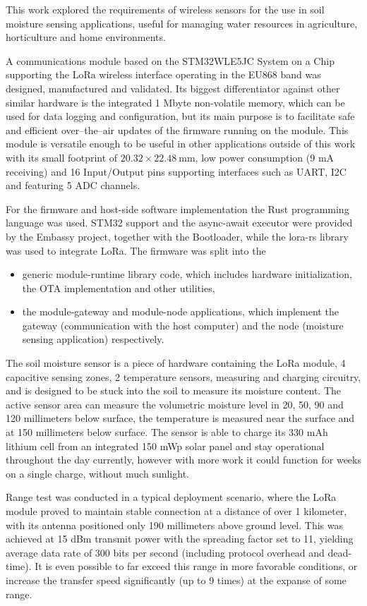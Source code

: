 
This work explored the requirements of wireless sensors for the use in soil moisture sensing applications, useful for managing water resources in agriculture, horticulture and home environments.

A communications module based on the STM32WLE5JC System on a Chip supporting the LoRa wireless interface operating in the EU868 band was designed, manufactured and validated. Its biggest differentiator against other similar hardware is the integrated 1 Mbyte non-volatile memory, which can be used for data logging and configuration, but its main purpose is to facilitate safe and efficient over--the--air updates of the firmware running on the module. This module is versatile enough to be useful in other applications outside of this work with its small footprint of $20.32 \times 22.48~\mathrm{mm}$, low power consumption (9 mA receiving) and 16 Input/Output pins supporting interfaces such as UART, I2C and featuring 5 ADC channels.

For the firmware and host-side software implementation the Rust programming language was used. STM32 support and the async-await executor were provided by the Embassy project, together with the Bootloader, while the lora-rs library was used to integrate LoRa. The firmware was split into the 
\begin{itemize}
    \item generic module-runtime library code, which includes hardware initialization, the OTA implementation and other utilities,
    \item the module-gateway and module-node applications, which implement the gateway (communication with the host computer) and the node (moisture sensing application) respectively.
\end{itemize}

The soil moisture sensor is a piece of hardware containing the LoRa module, 4 capacitive sensing zones, 2 temperature sensors, measuring and charging circuitry, and is designed to be stuck into the soil to measure its moisture content. The active sensor area can measure the volumetric moisture level in 20, 50, 90 and 120 millimeters below surface, the temperature is measured near the surface and at 150 millimeters below surface. The sensor is able to charge its 330 mAh lithium cell from an integrated 150 mWp solar panel and stay operational throughout the day currently, however with more work it could function for weeks on a single charge, without much sunlight.

Range test was conducted in a typical deployment scenario, where the LoRa module proved to maintain stable connection at a distance of over 1 kilometer, with its antenna positioned only 190 millimeters above ground level. This was achieved at 15 dBm transmit power with the spreading factor set to 11, yielding average data rate of 300 bits per second (including protocol overhead and dead-time). It is even possible to far exceed this range in more favorable conditions, or increase the transfer speed significantly (up to 9 times) at the expanse of some range.
